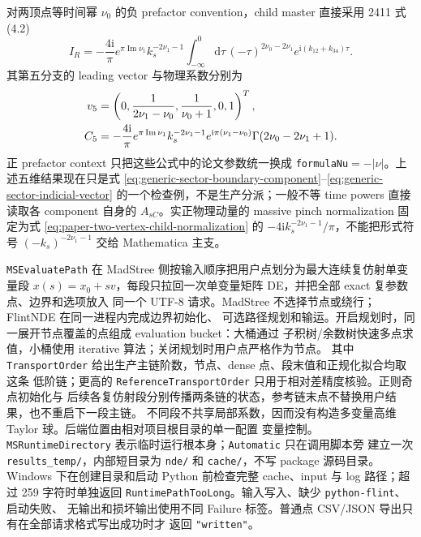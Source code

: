\documentclass[11pt,a4paper]{ctexart}
\newcommand{\dd}{\mathrm d}
\newcommand{\ii}{\mathrm i}
\begin{document}
对两顶点等时间幂 $\nu_0$ 的负 prefactor convention，child master 直接采用 2411 式 (4.2)
\begin{equation}
 I_R=-\frac{4\ii}{\pi}e^{\pi\operatorname{Im}\nu_1}k_s^{-2\nu_1-1}
 \int_{-\infty}^{0}\dd\tau\,(-\tau)^{2\nu_0-2\nu_1}
 e^{\ii(k_{12}+k_{34})\tau}.
 \label{eq:paper-two-vertex-child-normalization}
\end{equation}
其第五分支的 leading vector 与物理系数分别为
\begin{align}
 v_5&=\left(0,\frac{1}{2\nu_1-\nu_0},\frac{1}{\nu_0+1},0,1\right)^T,
 \notag\\
 C_5&=-\frac{4\ii}{\pi}e^{\pi\operatorname{Im}\nu_1}
 k_s^{-2\nu_1-1}e^{\ii\pi(\nu_1-\nu_0)}
 \Gamma(2\nu_0-2\nu_1+1).
 \label{eq:paper-two-vertex-contact-boundary}
\end{align}
正 prefactor context 只把这些公式中的论文参数统一换成 \texttt{formulaNu}$=-|\nu|$。上述五维结果现在只是式 \eqref{eq:generic-sector-boundary-component}--\eqref{eq:generic-sector-indicial-vector} 的一个检查例，不是生产分派；一般不等 time powers 直接读取各 component 自身的 $A_{sC}$。实正物理动量的 massive pinch normalization 固定为式 \eqref{eq:paper-two-vertex-child-normalization} 的 $-4\ii k_s^{-2\nu_1-1}/\pi$，不能把形式符号 $(-k_s)^{-2\nu_1-1}$ 交给 Mathematica 主支。

\texttt{MSEvaluatePath} 在 MadStree 侧按输入顺序把用户点划分为最大连续复仿射单变量段
$x(s)=x_0+s v$，每段只拉回一次单变量矩阵 DE，并把全部 exact 复参数点、边界和选项放入
同一个 UTF-8 请求。MadStree 不选择节点或绕行；FlintNDE 在同一进程内完成边界初始化、
可选路径规划和输运。开启规划时，同一展开节点覆盖的点组成 evaluation bucket：大桶通过
子积树/余数树快速多点求值，小桶使用 iterative 算法；关闭规划时用户点严格作为节点。
其中 \texttt{TransportOrder} 给出生产主链阶数，节点、dense 点、段末值和正规化拟合均取这条
低阶链；更高的 \texttt{ReferenceTransportOrder} 只用于相对差精度核验。正则奇点初始化与
后续各复仿射段分别传播两条链的状态，参考链末点不替换用户结果，也不重启下一段主链。
不同段不共享局部系数，因而没有构造多变量高维 Taylor 球。后端位置由相对项目根目录的单一配置
变量控制。\texttt{MSRuntimeDirectory} 表示临时运行根本身；\texttt{Automatic} 只在调用脚本旁
建立一次 \texttt{results\_temp/}，内部短目录为 \texttt{nde/} 和 \texttt{cache/}，不写 package
源码目录。Windows 下在创建目录和启动 Python 前检查完整 cache、input 与 log 路径；超过 259
字符时单独返回 \texttt{RuntimePathTooLong}。输入写入、缺少 \texttt{python-flint}、启动失败、
无输出和损坏输出使用不同 Failure 标签。普通点 CSV/JSON 导出只有在全部请求格式写出成功时才
返回 \texttt{"written"}。
\end{document}
